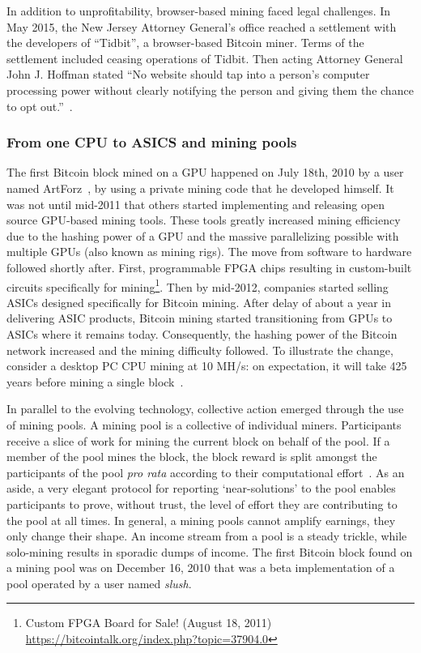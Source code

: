 In addition to unprofitability, browser-based mining faced legal challenges. In May 2015, the New Jersey Attorney General's office reached a settlement with the developers of ``Tidbit'', a browser-based Bitcoin miner. Terms of the settlement included ceasing operations of Tidbit. Then acting Attorney General John J. Hoffman stated ``No website should tap into a person's computer processing power without clearly notifying the person and giving them the chance to opt out.''~\cite{njcourtbitcoinjsminer}.

\subsubsection{From one CPU to ASICS and mining pools}


The first Bitcoin block mined on a GPU happened on July 18th, 2010 by a user named ArtForz~\cite{bitcoinhistory}, by using a private mining code that he developed himself. It was not until mid-2011 that others started implementing and releasing open source GPU-based mining tools. These tools greatly increased mining efficiency due to the hashing power of a GPU and the massive parallelizing possible with multiple GPUs (also known as mining rigs). The move from software to hardware followed shortly after. First, programmable FPGA chips resulting in custom-built circuits specifically for mining\footnote{Custom FPGA Board for Sale! (August 18, 2011) \url{https://bitcointalk.org/index.php?topic=37904.0}}. Then by mid-2012, companies started selling ASICs designed specifically for Bitcoin mining. After delay of about a year in delivering ASIC products, Bitcoin mining started transitioning from GPUs to ASICs where it remains today. Consequently, the hashing power of the Bitcoin network increased and the mining difficulty followed. To illustrate the change, consider a desktop PC CPU mining at 10 MH/s: on expectation, it will take 425 years before mining a single block~\cite{huang2014botcoin}. 

In parallel to the evolving technology, collective action emerged through the use of mining pools. A mining pool is a collective of individual miners. Participants receive a slice of work for mining the current block on behalf of the pool. If a member of the pool mines the block, the block reward is split amongst the participants of the pool \textit{pro rata} according to their computational effort~\cite{rosenfeld2011analysis}. As an aside, a very elegant protocol for reporting `near-solutions' to the pool enables participants to prove, without trust, the level of effort they are contributing to the pool at all times. In general, a mining pools cannot amplify earnings, they only change their shape. An income stream from a pool is a steady trickle, while solo-mining results in sporadic dumps of income. The first Bitcoin block found on a mining pool was on December 16, 2010 that was a beta implementation of a pool operated by a user named \textit{slush}.

